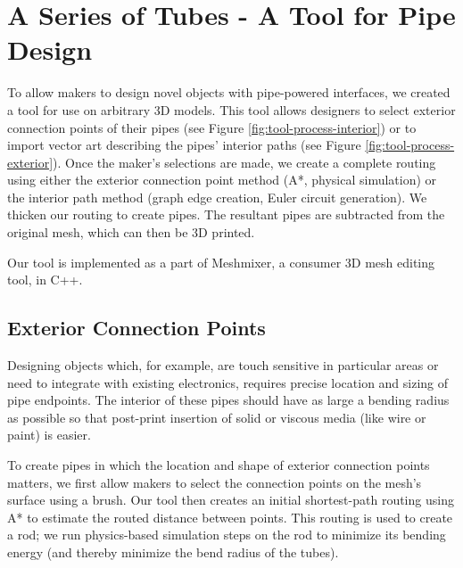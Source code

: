 \section{A Series of Tubes - A Tool for Pipe Design}

To allow makers to design novel objects with pipe-powered interfaces, we created a tool for use on arbitrary 3D models.  This tool allows designers to select exterior connection points of their pipes (see Figure \ref{fig:tool-process-interior}) or to import vector art describing the pipes' interior paths (see Figure \ref{fig:tool-process-exterior}).  Once the maker's selections are made, we create a complete routing using either the exterior connection point method (A*, physical simulation) or the interior path method (graph edge creation, Euler circuit generation).  We thicken our routing to create pipes.   The resultant pipes are subtracted from the original mesh, which can then be 3D printed.

Our tool is implemented as a part of Meshmixer, a consumer 3D mesh editing tool, in C++.

\subsection{Exterior Connection Points}

Designing objects which, for example, are touch sensitive in particular areas or need to integrate with existing electronics, requires precise location and sizing of pipe endpoints.  The interior of these pipes should have as large a bending radius as possible so that post-print insertion of solid or viscous media (like wire or paint) is easier.

To create pipes in which the location and shape of exterior connection points matters, we first allow makers to select the connection points on the mesh's surface using a brush. Our tool then creates an initial shortest-path routing using A* to estimate the routed distance between points.  This routing is used to create a rod; we run physics-based simulation steps on the rod to minimize its bending energy (and thereby minimize the bend radius of the tubes).

